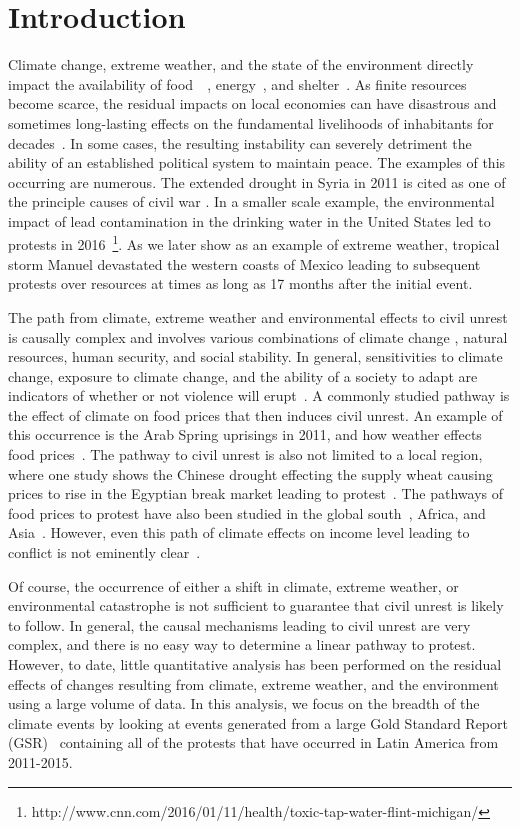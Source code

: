 \section{Introduction}
Climate change, extreme weather, and the state of the environment directly impact the availability of food~\cite{RW3}~\cite{akil2014effects}, energy~\cite{mitigation2011ipcc}, and shelter~\cite{warner2009search}.
As finite resources become scarce, the residual impacts on local economies can have disastrous and sometimes long-lasting effects on the fundamental livelihoods of inhabitants for decades~\cite{le2001political}.
In some cases, the resulting instability can severely detriment the ability of an established political system to maintain peace.
The examples of this occurring are numerous.
The extended drought in Syria in 2011 is cited as one of the principle causes of civil war \cite{gleick2014water,kelley2015climate}.
In a smaller scale example, the environmental impact of lead contamination in the drinking water in the United States led to protests in 2016~\footnote{http://www.cnn.com/2016/01/11/health/toxic-tap-water-flint-michigan/}.
As we later show as an example of extreme weather, tropical storm Manuel devastated the western coasts of Mexico leading to subsequent protests over resources at times as long as 17 months after the initial event.


The path from climate, extreme weather and environmental effects to civil unrest is causally complex \cite{hsiang2011civil,RW5} and involves various combinations of climate change \cite{burke2014climate}, natural resources, human security, and social stability.
In general, sensitivities to climate change, exposure to climate change, and the ability of a society to adapt are indicators of whether or not violence will erupt~\cite{RW9}.
A commonly studied pathway is the effect of climate on food prices that then induces civil unrest.
An example of this occurrence is the Arab Spring uprisings in 2011, and how weather effects food prices~\cite{RW2}.
The pathway to civil unrest is also not limited to a local region, where one study shows the Chinese drought effecting the supply wheat causing prices to rise in the Egyptian break market leading to protest~\cite{RW1}.
The pathways of food prices to protest have also been studied in the global south~\cite{RW4}, Africa, and Asia~\cite{wischnath2014climate,RW6}.
However, even this path of climate effects on income level leading to conflict is not eminently clear~\cite{RW10}.


Of course, the occurrence of either a shift in climate, extreme weather, or environmental catastrophe is not sufficient to guarantee that civil unrest is likely to follow.
In general, the causal mechanisms leading to civil unrest are very complex, and there is no easy way to determine a linear pathway to protest.
However, to date, little quantitative analysis has been performed on the residual effects of changes resulting from climate, extreme weather, and the environment using a large volume of data. In this analysis, we focus on the breadth of the climate events by looking at events generated from a large Gold Standard Report (GSR)~\cite{ramakrishnan2014beating} containing all of the protests that have occurred in Latin America from 2011-2015.

